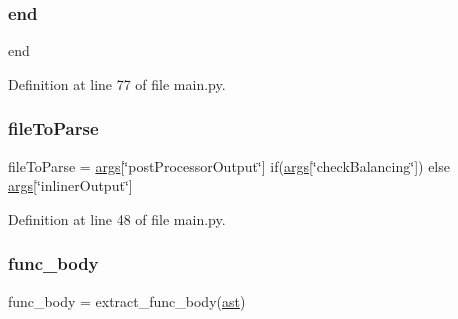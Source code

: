 \mbox{\label{namespaceRegBalancer_1_1src_1_1main_afb358f48b1646c750fb9da6c6585be2b}} 
\subsubsection{\texorpdfstring{end}{end}}
{\footnotesize\ttfamily end}



Definition at line 77 of file main.\+py.

\mbox{\label{namespaceRegBalancer_1_1src_1_1main_a7b981d9b48acf5de0d1fefa71978ce4a}} 
\subsubsection{\texorpdfstring{file\+To\+Parse}{fileToParse}}
{\footnotesize\ttfamily file\+To\+Parse = \hyperlink{namespaceRegBalancer_1_1src_1_1main_a8187411843a6284ffb964ef3fb9fcab3}{args}\mbox{[}\char`\"{}post\+Processor\+Output\char`\"{}\mbox{]} if(\hyperlink{namespaceRegBalancer_1_1src_1_1main_a8187411843a6284ffb964ef3fb9fcab3}{args}\mbox{[}\char`\"{}check\+Balancing\char`\"{}\mbox{]}) else \hyperlink{namespaceRegBalancer_1_1src_1_1main_a8187411843a6284ffb964ef3fb9fcab3}{args}\mbox{[}\char`\"{}inliner\+Output\char`\"{}\mbox{]}}



Definition at line 48 of file main.\+py.

\mbox{\label{namespaceRegBalancer_1_1src_1_1main_a6f1918359d19ff0f2ae80e155c83c951}} 
\subsubsection{\texorpdfstring{func\+\_\+body}{func\_body}}
{\footnotesize\ttfamily func\+\_\+body = extract\+\_\+func\+\_\+body(\hyperlink{namespaceRegBalancer_1_1src_1_1main_a83d838e3813fb5999c0492e0d9474bd9}{ast})}



